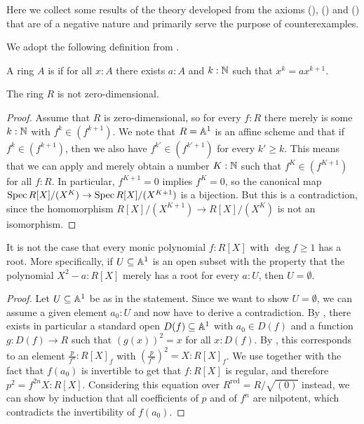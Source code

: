 Here we collect some results of
the theory developed from the axioms
(), () and ()
that are of a negative nature
and primarily serve the purpose of counterexamples.

We adopt the following definition from
\cite[Section IV.8]{lombardi-quitte}.

\begin{definition}%
  \label{zero-dimensional-ring}
  A ring $A$ is 
  if for all $x : A$
  there exists $a : A$ and $k : \mathbb{N}$
  such that $x^k = a x^{k + 1}$.
\end{definition}

\begin{lemma}%
  \label{R-not-zero-dimensional}
  The ring $R$ is not zero-dimensional.
\end{lemma}

\begin{proof}
  Assume that $R$ is zero-dimensional,
  so for every $f : R$ there merely is some $k : \mathbb{N}$ with $f^k \in (f^{k + 1})$.
  We note that $R = \mathbb{A}^1$ is an affine scheme and
  that if $f^k \in (f^{k + 1})$,
  then we also have $f^{k'} \in (f^{k' + 1})$ for every $k' \geq k$.
  This means that we can apply 
  and merely obtain a number $K : \mathbb{N}$
  such that $f^K \in (f^{K + 1})$ for all $f : R$.
  In particular, $f^{K + 1} = 0$ implies $f^K = 0$,
  so the canonical map
  $\operatorname{Spec} R[X]/(X^K) \to \operatorname{Spec} R[X]/(X^{K + 1})$
  is a bijection.
  But this is a contradiction,
  since the homomorphism $R[X]/(X^{K + 1}) \to R[X]/(X^K)$
  is not an isomorphism.
\end{proof}

\begin{example}%
  \label{non-existence-of-roots}
  It is not the case that
  every monic polynomial $f : R[X]$ with $\deg f \geq 1$ has a root.
  More specifically,
  if $U \subseteq \mathbb{A}^1$ is an open subset
  with the property that
  the polynomial $X^2 - a : R[X]$ merely has a root
  for every $a : U$,
  then $U = \emptyset$.
\end{example}

\begin{proof}
  Let $U \subseteq \mathbb{A}^1$ be as in the statement.
  Since we want to show $U = \emptyset$,
  we can assume a given element $a_0 : U$
  and now have to derive a contradiction.
  By ,
  there exists in particular a standard open $D(f) \subseteq \mathbb{A}^1$
  with $a_0 \in D(f)$
  and a function $g : D(f) \to R$
  such that ${(g(x))}^2 = x$ for all $x : D(f)$.
  By ,
  this corresponds to an element $\frac{p}{f^n} : R[X]_f$
  with ${(\frac{p}{f^n})}^2 = X : R[X]_f$.
  We use 
  together with the fact that $f(a_0)$ is invertible
  to get that $f : R[X]$ is regular,
  and therefore $p^2 = f^{2n}X : R[X]$.
  Considering this equation over $R^{\mathrm{red}} = R/\sqrt{(0)}$ instead,
  we can show by induction that all coefficients of $p$ and of $f^n$ are nilpotent,
  which contradicts the invertibility of $f(a_0)$.
\end{proof}

